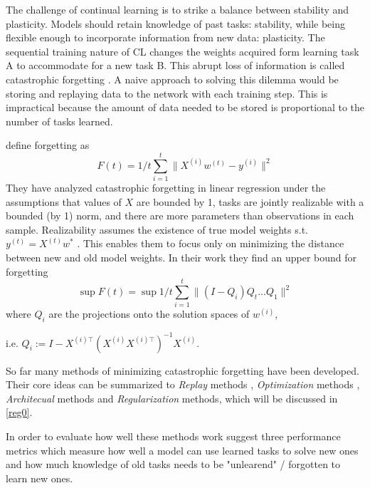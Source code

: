 The challenge of continual learning is to strike a balance between stability and plasticity. Models should retain knowledge of past tasks: stability, while being flexible enough to incorporate information from new data: plasticity. The sequential training nature of CL changes the weights acquired form learning task A to accommodate for a new task B. This abrupt loss of information is called catastrophic forgetting \cite{FRENCH1999128, Mcclelland1995, MCCLOSKEY1989109, Ratcliff1990ConnectionistMO}. A naive approach to solving this dilemma would be storing and replaying data to the network with each training step. This is impractical because the amount of data needed to be stored is proportional to the number of tasks learned.

\citeauthor{evron2022} \cite{evron2022} define forgetting as
\begin{equation}
	F(t) = 1/t \sum_{i=1}^{t}\lVert X^{(i)} w^{(t)} - y^{(i)} \rVert^2
\end{equation}
They have analyzed catastrophic forgetting in linear regression under the assumptions that values of $X$ are bounded by 1, tasks are jointly realizable with a bounded (by 1) norm, and there are more parameters than observations in each sample. Realizability assumes the existence of true model weights s.t. $y^{(t)}=X^{(t)}w^*$ \cite{Shalev-Shwartz}. This enables them to focus only on minimizing the distance between new and old model weights. In their work they find an upper bound for forgetting
\begin{equation}
	\sup F(t) = \sup 1/t \sum_{i=1}^{t}\lVert(I-Q_i)Q_t ... Q_1\rVert^2
\end{equation}
where $Q_i$ are the projections onto the solution spaces of $w^{(i)}$, 

i.e. $Q_i := I - X^{(i)\top}(X^{(i)} X^{(i)\top})^{-1} X^{(i)}$.

So far many methods of minimizing catastrophic forgetting have been developed. Their core ideas can be summarized to \textit{Replay} methods \cite{chaudhry2019,rebuffi2017icarlincrementalclassifierrepresentation, aljundi2019gradientbasedsampleselection}, \textit{Optimization} methods \cite{lopezpaz2022gradientepisodicmemorycontinual, javed2019metalearningrepresentationscontinuallearning, mirzadeh2020understandingroletrainingregimes}, \textit{Architecual} methods \cite{mallya2018piggybackadaptingsinglenetwork, ebrahimi2020adversarialcontinuallearning, fernando2017pathnetevolutionchannelsgradient} and \textit{Regularization} methods, which will be discussed in \autoref{reg0}.

In order to evaluate how well these methods work \citeauthor{lopezpaz2022gradientepisodicmemorycontinual} \cite{lopezpaz2022gradientepisodicmemorycontinual} suggest three performance metrics which measure how well a model can use learned tasks to solve new ones and how much knowledge of old tasks needs to be "unlearend" / forgotten to learn new ones.